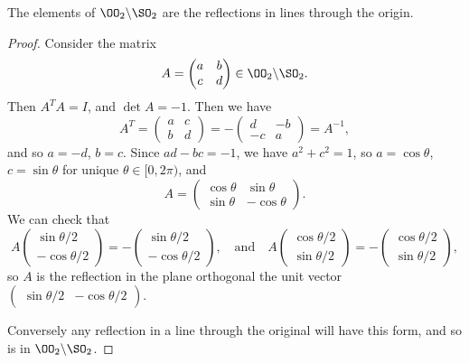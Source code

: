 \begin{theorem}
	The elements of $\OO_2 \backslash \SO_2$ are the reflections in lines through the origin.
\end{theorem}
\begin{proof}
	Consider the matrix
	$$
A = \begin{pmatrix}
	a & b \\ c & d
\end{pmatrix} \in \OO_2 \backslash \SO_2.
	$$
	Then $A^T A = I$, and $\det A = -1$. Then we have
	$$
A^T = \begin{pmatrix}
	a & c \\ b & d
\end{pmatrix} = - \begin{pmatrix}
	d & -b \\-c & a
\end{pmatrix} = A^{-1},
	$$
and so $a = -d$, $b = c$. Since $ad - bc = -1$, we have $a^2 + c^2 = 1$, so $a = \cos \theta$, $c = \sin \theta$ for unique $\theta \in [0, 2\pi)$, and
$$
A = \begin{pmatrix}
	\cos \theta & \sin \theta \\
	\sin \theta & - \cos \theta
\end{pmatrix}.
$$
We can check that
$$
A\begin{pmatrix}
	\sin \theta/2 \\
	-\cos \theta/2
\end{pmatrix} = - \begin{pmatrix}
	\sin \theta/2 \\
	-\cos \theta/2
\end{pmatrix},
\quad \text{and}\quad
A\begin{pmatrix}
	\cos \theta/2 \\
	\sin \theta/2
\end{pmatrix} = - \begin{pmatrix}
	\cos \theta/2 \\
	\sin \theta/2
\end{pmatrix},
$$
so $A$ is the reflection in the plane orthogonal the unit vector $\begin{pmatrix}
	\sin \theta/2 & -\cos \theta/2
\end{pmatrix}$. 

Conversely any reflection in a line through the original will have this form, and so is in $\OO_2 \backslash \SO_2$.
\end{proof}

